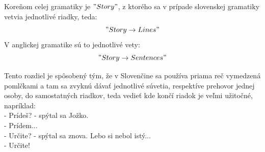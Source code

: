 \documentclass[12pt,a4paper]{report}
\theoremstyle{definition}
\theoremstyle{remark}
\begin{document}
Koreňom celej gramatiky je $"Story"$, z ktorého sa v prípade slovenskej gramatiky vetvia jednotlivé riadky, teda: $$"Story \to Lines "$$  V anglickej gramatike sú to jednotlivé vety: $$"Story \to Sentences "$$

Tento rozdiel je spôsobený tým, že v Slovenčine sa používa priama reč vymedzená pomlčkami a tam sa zvyknú dávať jednotlivé súvetia, respektíve prehovor jednej osoby, do samostatných riadkov, teda vedieť kde končí riadok je veľmi užitočné, napríklad: \\

\noindent - Prídeš? - spýtal sa Jožko.\\
- Prídem...\\
- Určite? - spýtal sa znova. Lebo si nebol istý...\\
- Určite! \\
\end{document}
